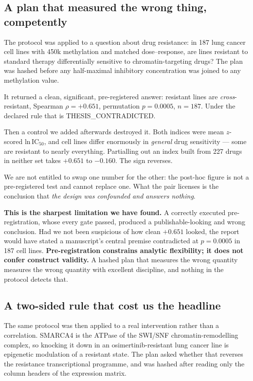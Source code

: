 \documentclass[11pt,a4paper]{article}
\begin{document}
\subsection{A plan that measured the wrong thing, competently}

The protocol was applied to a question about drug resistance: in 187 lung cancer cell lines with
450k methylation and matched dose--response, are lines resistant to standard therapy differentially
sensitive to chromatin-targeting drugs? The plan was hashed before any half-maximal inhibitory
concentration was joined to any methylation value.

It returned a clean, significant, pre-registered answer: resistant lines are \emph{cross}-resistant,
Spearman $\rho = +0.651$, permutation $p = 0.0005$, $n = 187$. Under the declared rule that is
THESIS\_CONTRADICTED.

Then a control we added afterwards destroyed it. Both indices were mean $z$-scored ln\,IC$_{50}$, and
cell lines differ enormously in \emph{general} drug sensitivity --- some are resistant to nearly
everything. Partialling out an index built from 227 drugs in neither set takes $+0.651$ to
$\mathbf{-0.160}$. The sign reverses.

We are not entitled to swap one number for the other: the post-hoc figure is not a pre-registered
test and cannot replace one. What the pair licenses is the conclusion that \emph{the design was
confounded and answers nothing}.

\textbf{This is the sharpest limitation we have found.} A correctly executed pre-registration, whose
every gate passed, produced a publishable-looking and wrong conclusion. Had we not been suspicious of
how clean $+0.651$ looked, the report would have stated a manuscript's central premise contradicted
at $p = 0.0005$ in 187 cell lines. \textbf{Pre-registration constrains analytic flexibility; it does
not confer construct validity.} A hashed plan that measures the wrong quantity measures the wrong
quantity with excellent discipline, and nothing in the protocol detects that.

\subsection{A two-sided rule that cost us the headline}

The same protocol was then applied to a real intervention rather than a correlation. SMARCA4 is the
ATPase of the SWI/SNF chromatin-remodelling complex, so knocking it down in an osimertinib-resistant
lung cancer line is epigenetic modulation of a resistant state. The plan asked whether that reverses
the resistance transcriptional programme, and was hashed after reading only the column headers of the
expression matrix.
\end{document}
